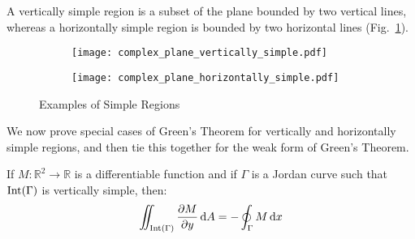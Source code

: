     A vertically simple region is a subset of the plane bounded by two
    vertical lines, whereas a horizontally simple region is
    bounded by two horizontal lines (Fig.~\ref{fig:Simply_Regions}).
    \begin{figure}[H]
        \centering
        \captionsetup{type=figure}
        \begin{subfigure}[b]{0.49\textwidth}
            \centering
            \captionsetup{type=figure}
            \texttt{[image: complex\_plane\_vertically\_simple.pdf]}
        \end{subfigure}
        \hfill
        \begin{subfigure}[b]{0.49\textwidth}
            \centering
            \captionsetup{type=figure}
            \texttt{[image: complex\_plane\_horizontally\_simple.pdf]}
        \end{subfigure}
        \caption{Examples of Simple Regions}
        \label{fig:Simply_Regions}
    \end{figure}
    We now prove special cases of Green's Theorem for vertically and
    horizontally simple regions, and then tie this together for the weak
    form of Green's Theorem.
    \begin{theorem}
        \label{thm:Greens_Theorem_Simple_t1_region}%
        If $M:\mathbb{R}^{2}\rightarrow\mathbb{R}$ is
        a differentiable function and if $\Gamma$ is a Jordan curve such
        that $\operatorname{Int}(\Gamma)$ is vertically simple, then:
        \begin{equation}
            \iint_{\operatorname{Int}(\Gamma)}\frac{\partial{M}}{\partial{y}}\mathop{}\!\mathrm{d}{A}
            =-\oint_{\Gamma}M\mathop{}\!\mathrm{d}{x}
        \end{equation}
    \end{theorem}
